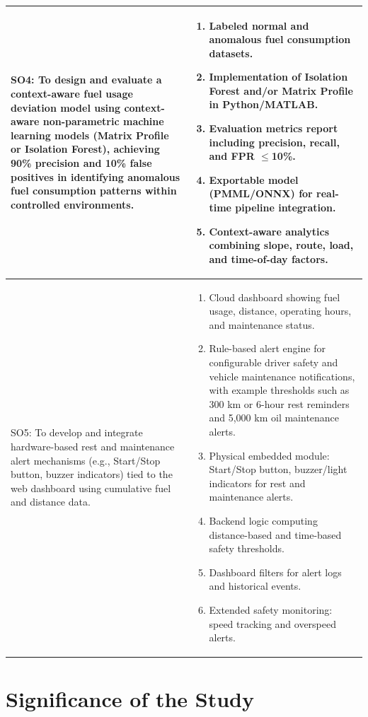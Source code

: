 \begin{SingleSpace}
\begin{longtable}{|p{}|p{}|}
SO4: To design and evaluate a context-aware fuel usage deviation model using context-aware non-parametric machine learning models (Matrix Profile or Isolation Forest), achieving 90\% precision and 10\% false positives in identifying anomalous fuel consumption patterns within controlled environments. &
\begin{enumerate}
    \item Labeled normal and anomalous fuel consumption datasets.
    \item Implementation of Isolation Forest and/or Matrix Profile in Python/MATLAB.
    \item Evaluation metrics report including precision, recall, and FPR\glsadd{FPR} $\leq$10\%.
    \item Exportable model (PMML/ONNX) for real-time pipeline integration.
    \item Context-aware analytics combining slope, route, load, and time-of-day factors.
\end{enumerate} \\
\hline

SO5: To develop and integrate hardware-based rest and maintenance alert mechanisms (e.g., Start/Stop button, buzzer indicators) tied to the web dashboard using cumulative fuel and distance data. &
\begin{enumerate}
    \item Cloud dashboard showing fuel usage, distance, operating hours, and maintenance status.
    \item Rule-based alert engine for configurable driver safety and vehicle maintenance notifications, with example thresholds such as 300 km or 6-hour rest reminders and 5,000 km oil maintenance alerts.
    \item Physical embedded module: Start/Stop button, buzzer/light indicators for rest and maintenance alerts.
    \item Backend logic computing distance-based and time-based safety thresholds.
    \item Dashboard filters for alert logs and historical events.
    \item Extended safety monitoring: speed tracking and overspeed alerts.
\end{enumerate} \\
\hline

\end{longtable}
\end{SingleSpace}




\section{Significance of the Study}

